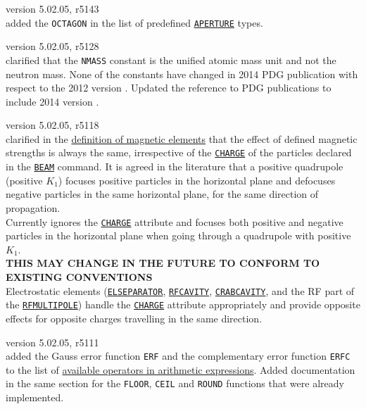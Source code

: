 \begin{madlist}
   version 5.02.05, r5143\\
  added the \texttt{OCTAGON} in the list of predefined 
  \hyperref[chap:aperture]{\texttt{APERTURE}} types.
  
   version 5.02.05, r5128\\
  clarified that the \texttt{NMASS} constant is the unified atomic mass 
  unit and not the neutron mass. None of the constants have changed in 2014 PDG 
  publication with respect to the 2012 version \cite{PDG2012}. Updated
  the reference to PDG publications to include 2014 version \cite{PDG2014}.

   version 5.02.05, r5118\\
  clarified in the \hyperref[chap:elements]{definition of magnetic elements} 
  that the effect of defined magnetic strengths is always the same, 
  irrespective of the \hyperref[sec:beam]{\texttt{CHARGE}} of the particles declared 
  in the \hyperref[sec:beam]{\texttt{BEAM}} command. It is agreed in the literature 
  that a positive quadrupole (positive $K_1$) focuses positive particles in the 
  horizontal plane and defocuses negative particles in the same horizontal 
  plane, for the same direction of propagation. \\ 
  Currently \mad ignores the \hyperref[sec:beam]{\texttt{CHARGE}} attribute and 
  focuses both positive and negative particles in the horizontal plane when 
  going through a quadrupole with positive $K_1$. \\
  \textbf{THIS MAY CHANGE IN THE FUTURE TO CONFORM TO EXISTING CONVENTIONS}\\
  Electrostatic elements (\hyperref[sec:elseparator]{\texttt{ELSEPARATOR}}, 
  \hyperref[sec:rfcavity]{\texttt{RFCAVITY}},
  \hyperref[sec:crabcavity]{\texttt{CRABCAVITY}}, and the RF part of the
  \hyperref[sec:rfmultipole]{\texttt{RFMULTIPOLE}}) handle the
  \hyperref[sec:beam]{\texttt{CHARGE}} attribute appropriately and provide 
  opposite effects for opposite charges travelling in the same direction. 


   version 5.02.05, r5111\\
  added the Gauss error function \texttt{ERF} and the complementary error function 
  \texttt{ERFC} to the list of \hyperref[subsec:operator]{available operators in 
  arithmetic expressions}. Added documentation in the same section for the 
  \texttt{FLOOR}, \texttt{CEIL} and \texttt{ROUND} functions that were already 
  implemented. 
  

\end{madlist}
